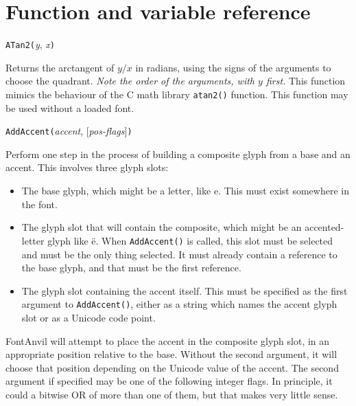 \chapter{Function and variable reference}



\texttt{ATan2(}\textit{y}, \textit{x}\texttt{)}

Returns the arctangent of $y/x$ in radians, using the signs of the arguments
to choose the quadrant.  \emph{Note the order of the arguments, with $y$
first.}  This function mimics the behaviour of the C math library
\texttt{atan2()} function.  This function may be used without a
loaded font.



\texttt{AddAccent(}\textit{accent}, [\textit{pos-flags}]\texttt{)}

Perform one step in the process of building a composite glyph from a base
and an accent.  This involves three glyph slots:
\begin{itemize}
  \item The base glyph, which might be a letter, like e.  This must exist
    somewhere in the font.
  \item The glyph slot that will contain the composite, which might be an
    accented-letter glyph like \"{e}.  When \texttt{AddAccent()} is called,
    this slot must be selected and must be the only thing selected.  It must
    already contain a reference to the base glyph, and that must be the
    first reference.
  \item The glyph slot containing the accent itself.  This must be specified
    as the first argument to \texttt{AddAccent()}, either as a string which
    names the accent glyph slot or as a Unicode code point.
\end{itemize}

FontAnvil will attempt to place the accent in the composite glyph slot, in
an appropriate position relative to the base.  Without the second argument,
it will choose that position depending on the Unicode value of the accent. 
The second argument if specified may be one of the
following integer flags.  In principle, it could a bitwise OR of more than
one of them, but that makes very little sense.

